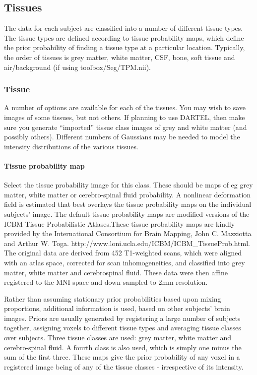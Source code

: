 \subsection{Tissues}
The data for each subject are classified into a number of different tissue types.  The tissue types are defined according to tissue probability maps, which define the prior probability of finding a tissue type at a particular location. Typically, the order of tissues is grey matter, white matter, CSF, bone, soft tissue and air/background (if using toolbox/Seg/TPM.nii).


\subsubsection{Tissue}
A number of options are available for each of the tissues.  You may wish to save images of some tissues, but not others. If planning to use DARTEL, then make sure you generate ``imported'' tissue class images of grey and white matter (and possibly others).  Different numbers of Gaussians may be needed to model the intensity distributions of the various tissues.


\paragraph{Tissue probability map}
Select the tissue probability image for this class. These should be maps of eg grey matter, white matter or cerebro-spinal fluid probability. A nonlinear deformation field is estimated that best overlays the tissue probability maps on the individual subjects' image. The default tissue probability maps are modified versions of the ICBM Tissue Probabilistic Atlases.These tissue probability maps are kindly provided by the International Consortium for Brain Mapping, John C. Mazziotta and Arthur W. Toga. http://www.loni.ucla.edu/ICBM/ICBM\_TissueProb.html. The original data are derived from 452 T1-weighted scans, which were aligned with an atlas space, corrected for scan inhomogeneities, and classified into grey matter, white matter and cerebrospinal fluid. These data were then affine registered to the MNI space and down-sampled to 2mm resolution.



Rather than assuming stationary prior probabilities based upon mixing proportions, additional information is used, based on other subjects' brain images.  Priors are usually generated by registering a large number of subjects together, assigning voxels to different tissue types and averaging tissue classes over subjects. Three tissue classes are used: grey matter, white matter and cerebro-spinal fluid. A fourth class is also used, which is simply one minus the sum of the first three. These maps give the prior probability of any voxel in a registered image being of any of the tissue classes - irrespective of its intensity.



